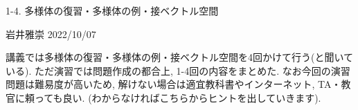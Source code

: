 \documentclass[dvipdfmx,a4paper,11pt]{article}
\newcommand{\R}{\mathbb{R}}
\theoremstyle{definition}
\newtheorem{dfn}[thm]{定義}
\begin{document}


\begin{center}
{\Large 1-4. 多様体の復習・多様体の例・接ベクトル空間}
\end{center}
\begin{flushright}
 岩井雅崇 2022/10/07
\end{flushright}

講義では多様体の復習・多様体の例・接ベクトル空間を4回かけて行う(と聞いている). ただ演習では問題作成の都合上, 1-4回の内容をまとめた. なお今回の演習問題は難易度が高いため, 解けない場合は適宜教科書やインターネット, TA・教官に頼っても良い. (わからなければこちらからヒントを出していきます).

\vspace{22pt}

\begin{comment}

\begin{tcolorbox}[
    colback = white,
    colframe = green!35!black,
    fonttitle = \bfseries,
    breakable = true]
    \begin{dfn}[多様体の定義]
    $r$を1以上の自然数または$\infty$とする. 位相空間$M$が次の条件を満たすとき, $C^r$級微分可能多様体と呼ぶ
    \begin{enumerate}
    \item $M$はハウスドルフ空間である.
    \item $M$は$m$次元の座標近傍$\{ (U_{\alpha}, \varphi_{\alpha})\}_{\alpha \in A}$で被覆される.
     ここで$(U_{\alpha}, \varphi_{\alpha})$が$m$次元の座標近傍であるとは, ある$\R^m$の開集合$U'_{\alpha}$があって$\varphi_{\alpha} : U_{\alpha} \rightarrow U'_{\alpha}$は同相写像である.
     \item $U_{\alpha} \cap U_{\beta} = \varnothing$なる$\alpha, \beta \in A$について
     $$
     \varphi_{\beta}: \circ \varphi_{\alpha}: \varphi_{\alpha}(U_{\alpha}\cap U_{\beta})
     \rightarrow  \varphi_{\beta}(U_{\alpha}\cap U_{\beta})
     $$
     は$C^r$級写像である.
       \end{enumerate}

    \end{dfn}
    \end{tcolorbox}

\begin{tcolorbox}[
    colback = white,
    colframe = green!35!black,
    fonttitle = \bfseries,
    breakable = true]
    \begin{dfn}[接ベクトル空間]
$M$を$C^1$級多様体とし, $(x_1, \ldots, x_m)$を点$p \in M$の局所座標系とする. 
$h$

    \end{dfn}
    \end{tcolorbox}
\end{comment}
\end{document}

